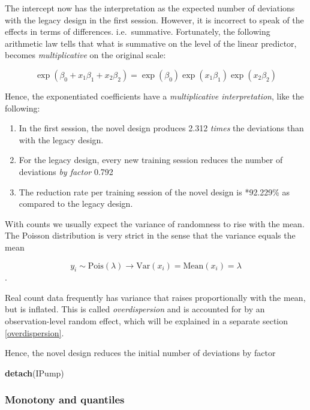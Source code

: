 \documentclass[]{svmono}
\newenvironment{Shaded}{\begin{snugshade}}{\end{snugshade}}
\newcommand{\KeywordTok}[1]{\textcolor[rgb]{0.13,0.29,0.53}{\textbf{#1}}}
\newcommand{\NormalTok}[1]{#1}
\providecommand{\tightlist}{%
  \setlength{\itemsep}{0pt}\setlength{\parskip}{0pt}}
\theoremstyle{definition}
\theoremstyle{definition}
\theoremstyle{definition}
\theoremstyle{remark}
\begin{document}
The intercept now has the interpretation as the expected number of
deviations with the legacy design in the first session. However, it is
incorrect to speak of the effects in terms of differences.
i.e.~summative. Fortunately, the following arithmetic law tells that
what is summative on the level of the linear predictor, becomes
\emph{multiplicative} on the original scale:

\[
\exp(\beta_0 + x_1\beta_1 + x_2\beta_2) =
\exp(\beta_0) \exp(x_1\beta_1) \exp(x_2\beta_2)
\]

Hence, the exponentiated coefficients have a \emph{multiplicative
interpretation}, like the following:

\begin{enumerate}
\def\labelenumi{\arabic{enumi}.}
\tightlist
\item
  In the first session, the novel design produces 2.312 \emph{times} the
  deviations than with the legacy design.
\item
  For the legacy design, every new training session reduces the number
  of deviations \emph{by factor} 0.792\\
\item
  The reduction rate per training session of the novel design is
  *92.229\% as compared to the legacy design.
\end{enumerate}

With counts we usually expect the variance of randomness to rise with
the mean. The Poisson distribution is very strict in the sense that the
variance equals the mean

\[
y_i \sim \textrm{Pois}(\lambda) \rightarrow \textrm{Var}(x_i) = \textrm{Mean}(x_i) = \lambda
\].

Real count data frequently has variance that raises proportionally with
the mean, but is inflated. This is called \emph{overdispersion} and is
accounted for by an observation-level random effect, which will be
explained in a separate section \ref{overdispersion}.

Hence, the novel design reduces the initial number of deviations by
factor

\begin{Shaded}
\begin{Highlighting}[]
\KeywordTok{detach}\NormalTok{(IPump)}
\end{Highlighting}
\end{Shaded}

\subsubsection{Monotony and quantiles}\label{monotony-and-quantiles}
\end{document}
